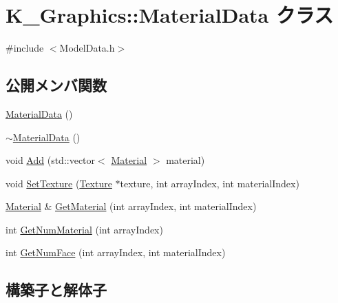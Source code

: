 \hypertarget{class_k___graphics_1_1_material_data}{}\section{K\+\_\+\+Graphics\+:\+:Material\+Data クラス}
\label{class_k___graphics_1_1_material_data}


{\ttfamily \#include $<$Model\+Data.\+h$>$}

\subsection*{公開メンバ関数}
\begin{DoxyCompactItemize}
\item 
\mbox{\hyperlink{class_k___graphics_1_1_material_data_a2b33d7d9cd004446593d6f761348e030}{Material\+Data}} ()
\item 
\mbox{\hyperlink{class_k___graphics_1_1_material_data_abb3d2d10a13964dac5e3947476085123}{$\sim$\+Material\+Data}} ()
\item 
void \mbox{\hyperlink{class_k___graphics_1_1_material_data_a79f87cea104917e512d4efeb85a69933}{Add}} (std\+::vector$<$ \mbox{\hyperlink{struct_k___graphics_1_1_material}{Material}} $>$ material)
\item 
void \mbox{\hyperlink{class_k___graphics_1_1_material_data_a5040fffa5ba469df48ed169bf90349e8}{Set\+Texture}} (\mbox{\hyperlink{class_k___graphics_1_1_texture}{Texture}} $\ast$texture, int array\+Index, int material\+Index)
\item 
\mbox{\hyperlink{struct_k___graphics_1_1_material}{Material}} \& \mbox{\hyperlink{class_k___graphics_1_1_material_data_a5dc07afe7317b6c8b18b02a164d97724}{Get\+Material}} (int array\+Index, int material\+Index)
\item 
int \mbox{\hyperlink{class_k___graphics_1_1_material_data_a20e0e4f37a782d66093cf1388db1ac33}{Get\+Num\+Material}} (int array\+Index)
\item 
int \mbox{\hyperlink{class_k___graphics_1_1_material_data_a98e8c1c9eef3bb242a1eff791514b18e}{Get\+Num\+Face}} (int array\+Index, int material\+Index)
\end{DoxyCompactItemize}


\subsection{構築子と解体子}
\mbox{\label{class_k___graphics_1_1_material_data_a2b33d7d9cd004446593d6f761348e030}} 
